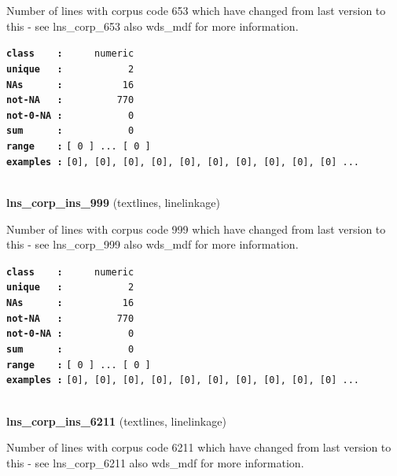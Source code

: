 \documentclass[]{article}
\begin{document}
Number of lines with corpus code 653 which have changed from last
version to this - see lns\_corp\_653 also wds\_mdf for more information.

\textbf{\texttt{class\ \ \ \ :}} \texttt{~~~~~numeric}\\
\textbf{\texttt{unique\ \ \ :}} \texttt{~~~~~~~~~~~2}\\
\textbf{\texttt{NAs\ \ \ \ \ \ :}} \texttt{~~~~~~~~~~16}\\
\textbf{\texttt{not-NA\ \ \ :}} \texttt{~~~~~~~~~770}\\
\textbf{\texttt{not-0-NA\ :}} \texttt{~~~~~~~~~~~0}\\
\textbf{\texttt{sum\ \ \ \ \ \ :}} \texttt{~~~~~~~~~~~0}\\
\textbf{\texttt{range\ \ \ \ :}}
\texttt{{[}\ 0\ {]}\ ...\ {[}\ 0\ {]}}\\
\textbf{\texttt{examples\ :}}
\texttt{{[}0{]},\ {[}0{]},\ {[}0{]},\ {[}0{]},\ {[}0{]},\ {[}0{]},\ {[}0{]},\ {[}0{]},\ {[}0{]},\ {[}0{]}\ ...}\\

~

\textbf{lns\_corp\_ins\_999} (textlines, linelinkage)

Number of lines with corpus code 999 which have changed from last
version to this - see lns\_corp\_999 also wds\_mdf for more information.

\textbf{\texttt{class\ \ \ \ :}} \texttt{~~~~~numeric}\\
\textbf{\texttt{unique\ \ \ :}} \texttt{~~~~~~~~~~~2}\\
\textbf{\texttt{NAs\ \ \ \ \ \ :}} \texttt{~~~~~~~~~~16}\\
\textbf{\texttt{not-NA\ \ \ :}} \texttt{~~~~~~~~~770}\\
\textbf{\texttt{not-0-NA\ :}} \texttt{~~~~~~~~~~~0}\\
\textbf{\texttt{sum\ \ \ \ \ \ :}} \texttt{~~~~~~~~~~~0}\\
\textbf{\texttt{range\ \ \ \ :}}
\texttt{{[}\ 0\ {]}\ ...\ {[}\ 0\ {]}}\\
\textbf{\texttt{examples\ :}}
\texttt{{[}0{]},\ {[}0{]},\ {[}0{]},\ {[}0{]},\ {[}0{]},\ {[}0{]},\ {[}0{]},\ {[}0{]},\ {[}0{]},\ {[}0{]}\ ...}\\

~

\textbf{lns\_corp\_ins\_6211} (textlines, linelinkage)

Number of lines with corpus code 6211 which have changed from last
version to this - see lns\_corp\_6211 also wds\_mdf for more
information.
\end{document}
